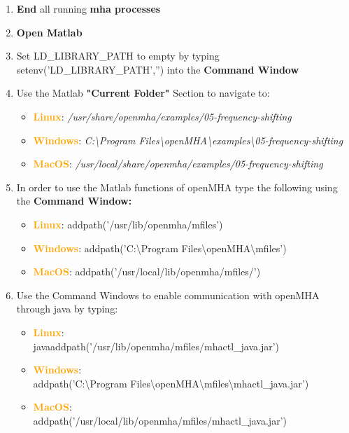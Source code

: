 \documentclass[11pt,a4paper,twoside]{article}
\newcommand{\+}{\discretionary{\mbox{\scriptsize$\hookleftarrow$}}{}{}}
\begin{document}
{{{\begin{enumerate}
\item \textbf{End} all running \textbf{mha processes} 
\item \textbf{Open Matlab} 
\item Set LD\_LIBRARY\_PATH to empty by typing {\ttfamily setenv('LD\_LIBRARY\_PATH','')} into the \textbf{Command Window}
\item Use the Matlab \textbf{"Current Folder"} Section to navigate to:

\begin{itemize}
\item \textcolor{orange}{\textbf{Linux}}: \textit{/usr/share/openmha/examples/05-frequency-shifting} 
\item \textcolor{orange}{\textbf{Windows}}: \textit{C:\textbackslash Program Files\textbackslash openMHA\textbackslash examples\textbackslash 05-frequency-shifting}
\item \textcolor{orange}{\textbf{MacOS}}: \textit{/usr/local/share/openmha/examples/05-frequency-shifting} 
\end{itemize}

\item In order to use the Matlab functions of openMHA type the following using the \textbf{Command Window:} 

\begin{itemize}
\item \textcolor{orange}{\textbf{Linux}}: {\ttfamily addpath('/usr/lib/openmha/mfiles')}
\item \textcolor{orange}{\textbf{Windows}}: {\ttfamily addpath('C:\textbackslash Program Files\textbackslash openMHA\textbackslash mfiles')}
\item \textcolor{orange}{\textbf{MacOS}}: {\ttfamily addpath('/usr/local/lib/openmha/mfiles/')}
\end{itemize}


\item Use the Command Windows to enable communication with openMHA through java by typing: 

\begin{itemize}
\item \textcolor{orange}{\textbf{Linux}}: \\{\ttfamily javaaddpath('/usr/lib/openmha/mfiles/mhactl\_java.jar')} 
\item \textcolor{orange}{\textbf{Windows}}: \\ {\ttfamily addpath('C:\textbackslash Program Files\textbackslash openMHA\textbackslash mfiles\textbackslash mhactl\_java.jar')}
\item \textcolor{orange}{\textbf{MacOS}}: \\ {\ttfamily addpath('/usr/local/lib/openmha/mfiles/mhactl\_java.jar')}
\end{itemize}


\end{enumerate}}}}
\end{document}
